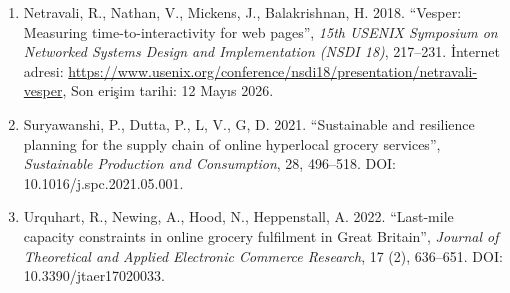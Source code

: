 \documentclass[10pt,a4paper]{article}
\begin{document}
\begin{enumerate}[leftmargin=1.4em]
\item Netravali, R., Nathan, V., Mickens, J., Balakrishnan, H. 2018. ``Vesper: Measuring time-to-interactivity for web pages'', \textit{15th USENIX Symposium on Networked Systems Design and Implementation (NSDI 18)}, 217--231. İnternet adresi: \url{https://www.usenix.org/conference/nsdi18/presentation/netravali-vesper}, Son erişim tarihi: 12 Mayıs 2026.
\item Suryawanshi, P., Dutta, P., L, V., G, D. 2021. ``Sustainable and resilience planning for the supply chain of online hyperlocal grocery services'', \textit{Sustainable Production and Consumption}, 28, 496--518. DOI: 10.1016/j.spc.2021.05.001.
\item Urquhart, R., Newing, A., Hood, N., Heppenstall, A. 2022. ``Last-mile capacity constraints in online grocery fulfilment in Great Britain'', \textit{Journal of Theoretical and Applied Electronic Commerce Research}, 17 (2), 636--651. DOI: 10.3390/jtaer17020033.
\end{enumerate}
\end{document}
